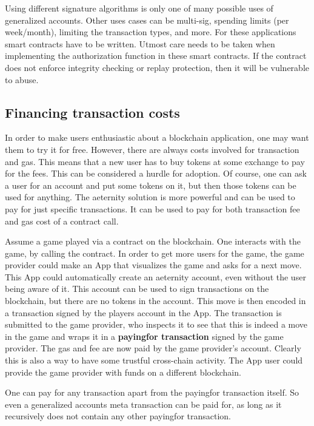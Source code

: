 Using different signature algorithms is only one of many possible uses
of generalized accounts. Other uses cases can be multi-sig, spending
limits (per week/month), limiting the transaction types, and more. For
these applications smart contracts have to be written. Utmost care
needs to be taken when implementing the authorization
function in these smart contracts. If the contract does not enforce
integrity checking or replay protection, then it will be vulnerable to
abuse.


\subsection{Financing transaction costs}
\label{sect:payingfor}

In order to make users enthusiastic about a blockchain application,
one may want them to try it for free. However, there are always costs
involved for transaction and gas. This means that a new user has to
buy tokens at some exchange to pay for the fees. This can be considered
a hurdle for adoption. Of course, one can ask a user for an account and put
some tokens on it, but then those tokens can be used for anything.
The aeternity solution is more powerful and can be used to pay for
just specific transactions. It can be used to pay for both transaction
fee and gas cost of a contract call.

Assume a game played via a contract on the blockchain. One interacts
with the game, by calling the contract. In order to get more users for
the game, the game provider could make an App that visualizes
the game and asks for a next move. This App could automatically create
an aeternity account, even without the user being aware of it. This
account can be used to sign transactions on the blockchain, but there
are no tokens in the account. This move is then encoded in a
transaction signed by the players account in the App. The transaction
is submitted to the game provider, who inspects it to see that this
is indeed a move in the game and wraps it in a \textbf{payingfor
  transaction} signed by the game provider. The gas and fee are now
paid by the game provider's account.
Clearly this is also a way to have some trustful cross-chain
activity. The App user could provide the game provider with funds on a
different blockchain.

One can pay for any transaction apart from the payingfor transaction
itself. So even a generalized accounts meta transaction can be paid
for, as long as it recursively does not contain any other payingfor
transaction.
